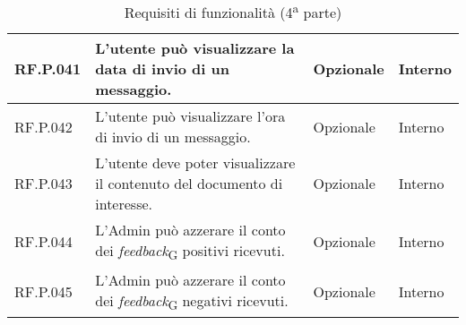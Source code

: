 \begin{table}[H]
\begin{tabular}{|C{2.7cm}|L{7.2cm}|C{2.7cm}|C{2cm}|}
        RF.P.041 & L’utente può visualizzare la data di invio di un messaggio.
         & Opzionale & Interno \\
        \hline
        RF.P.042 & L’utente può visualizzare l'ora di invio di un messaggio.
         & Opzionale & Interno \\
        \hline
        RF.P.043 & L’utente deve poter visualizzare il contenuto del documento di interesse.
         & Opzionale & Interno \\
        \hline
        RF.P.044 & L'Admin può azzerare il conto dei \textit{feedback}\textsubscript{G} positivi ricevuti.
         & Opzionale & Interno \\
        \hline
        RF.P.045 & L'Admin può azzerare il conto dei \textit{feedback}\textsubscript{G} negativi ricevuti.
         & Opzionale & Interno \\
        \hline
    \end{tabular}
    \caption{Requisiti di funzionalità (4\textsuperscript{a}  parte)}
\end{table}

\newpage
